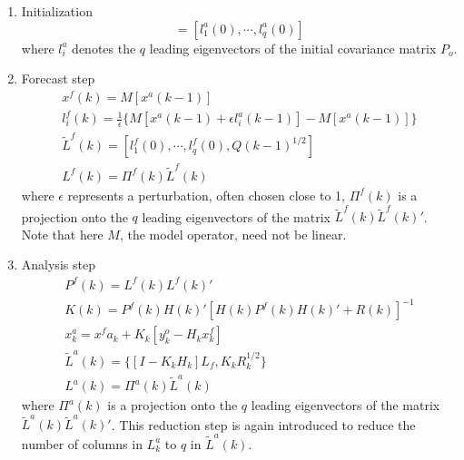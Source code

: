 \documentclass[a4paper,12pt]{article}
\begin{document}
       \begin{enumerate}
        \item Initialization
              \begin{equation}
                 [L^a(0)]=[l_1^a(0),\cdots,l_q^a(0)]
              \end{equation}
              where $l_i^a$ denotes the $q$ leading eigenvectors of the initial covariance matrix $P_o$.

        \item Forecast step
              \begin{eqnarray}
               x^f(k)=M[x^a(k-1)] \\
               l^f_i(k)=\frac{1}{\epsilon} \{ M[x^a(k-1)+ \epsilon  l^a_i(k-1)]-M[x^a(k-1)] \} \\
               \tilde{L}^f(k)=[l_1^f(0),\cdots,l_q^f(0),Q(k-1)^{1/2}] \\
               L^f(k)=\Pi^f(k)\tilde{L}^f(k)
              \end{eqnarray}
              where $\epsilon$ represents a perturbation, often chosen close to 1, $\Pi^f(k)$ is a projection onto the $q$ leading eigenvectors of the matrix $\tilde{L}^f(k)\tilde{L}^f(k)'$. Note that here $M$, the model operator, need not be linear.

        \item Analysis step
              \begin{eqnarray}
                P^f(k)=L^f(k)L^f(k)' \\
                K(k) = P^f(k)H(k)'[H(k)P^f(k)H(k)'+R(k)]^{-1} \\
                x^a_k = x^fa_k + K_k [y^o_k - H_k x^f_k] \\
                \tilde{L}^a(k)=\{[I - K_k H_k] L_f, K_k R_k^{1/2}\} \\
                L^a(k)=\Pi^a(k)\tilde{L}^a(k)
              \end{eqnarray}
              where $\Pi^a(k)$ is a projection onto the $q$ leading eigenvectors of the matrix $\tilde{L}^a(k)\tilde{L}^a(k)'$. This reduction step is again introduced to reduce the number of columns in $L^a_k$ to $q$ in $\tilde{L}^a(k)$.

       \end{enumerate}

\end{document}
